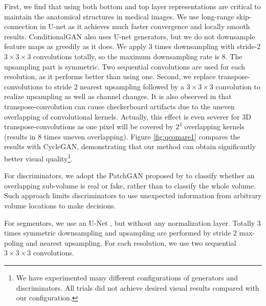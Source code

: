 \documentclass[10pt,twocolumn,letterpaper]{article}
\begin{document}
First, we find that using both bottom and top layer representations are critical to maintain the anatomical structures in medical images. We use long-range skip-connection in U-net \cite{ronneberger2015u} as it achieves much faster convergence and locally smooth results. ConditionalGAN also uses U-net generators, but we do not downsample feature maps as greedily as it does. We apply $3$ times downsampling with stride-2 $3{\times}3{\times}3$ convolutions totally, so the maximum downsampling rate is $8$. The upsampling part is symmetric. Two sequential convolutions are used for each resolution, as it performs better than using one.
Second, we replace transpose-convolutions to stride $2$ nearest upsampling followed by a $3{\times}3{\times}3$ convolution to realize upsampling as well as channel changes. It is also observed in \cite{odena2016deconvolution} that transpose-convolution can cause checkerboard artifacts due to the uneven overlapping of convolutional kernels. Actually, this effect is even severer for 3D transpose-convolutions as one pixel will be covered by $2^3$ overlapping kernels (results in 8 times uneven overlapping).  Figure \ref{fig:qcomare1} compares the results with CycleGAN, demonstrating that our method can obtain significantly better visual quality\footnote{We have experimented many different configurations of generators and discriminators. All trials did not achieve desired visual results compared with our configuration. }. 

For discriminators, we adopt the PatchGAN proposed by \cite{shrivastava2016learning} to classify whether an overlapping sub-volume is real or fake, rather than to classify the whole volume. Such approach limits discriminators to use unexpected information from arbitrary volume locations to make decisions. 

For segmentors, we use an U-Net \cite{ronneberger2015u}, but without any normalization layer. Totally 3 times symmetric downsampling and upsampling are performed by stride $2$ max-poling and nearest upsampling. For each resolution, we use two sequential $3{\times}3{\times}3$ convolutions.
\end{document}
